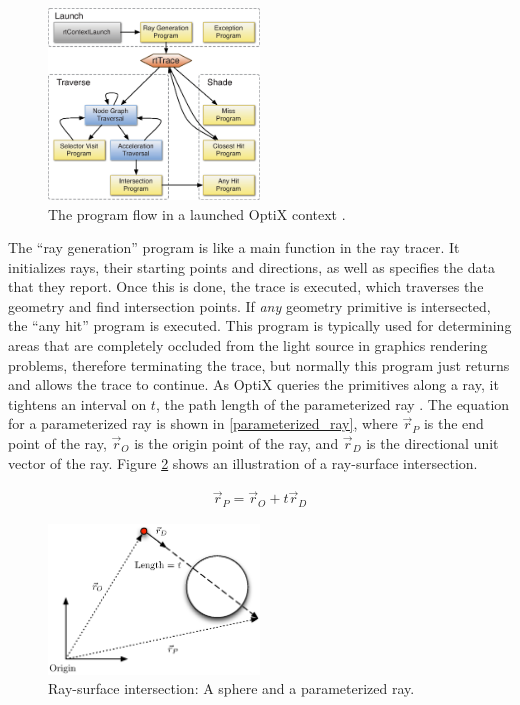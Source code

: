 \begin{figure}[h!] 
  \centering
    \includegraphics[width=0.5\textwidth]{graphics/optix_flow.eps}
     \caption{The program flow in a launched OptiX context \cite{optix_paper}. \label{optix_flow}}
\end{figure}

The ``ray generation'' program is like a main function in the ray tracer. It initializes rays, their starting points and directions, as well as specifies the data that they report.  Once this is done, the trace is executed, which traverses the geometry and find intersection points.  If \emph{any} geometry primitive is intersected, the ``any hit'' program is executed.  This program is typically used for determining areas that are completely occluded from the light source in graphics rendering problems, therefore terminating the trace, but normally this program just returns and allows the trace to continue.  As OptiX queries the primitives along a ray, it tightens an interval on $t$, the path length of the parameterized ray \cite{optix}.  The equation for a parameterized ray is shown in \eqref{parameterized_ray}, where $\vec{r}_P$ is the end point of the ray, $\vec{r}_O$ is the origin point of the ray, and $\vec{r}_D$ is the directional unit vector of the ray.  Figure \ref{ray_surface} shows an illustration of a ray-surface intersection.

\begin{equation}
\label{parameterized_ray}
\begin{split}
\vec{r}_P = \vec{r}_O + t \vec{r}_D 
\end{split}
\end{equation}

\begin{figure}[h!] 
  \centering
    \includegraphics[width=0.5\textwidth]{graphics/ray_surface.eps}
     \caption{Ray-surface intersection:  A sphere and a parameterized ray. \label{ray_surface}}
\end{figure}

